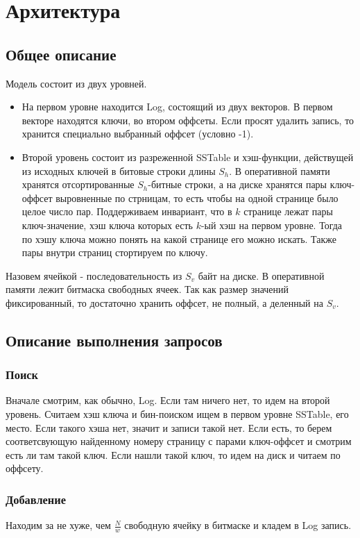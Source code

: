 \section*{Архитектура}
  \subsection*{Общее описание}
      Модель состоит из двух уровней. 
      \begin{itemize} 
      \item 
        На первом уровне находится Log, состоящий из двух векторов. В первом векторе находятся ключи, во втором оффсеты. Если просят удалить запись, то хранится специально выбранный оффсет (условно -1).
      \item
        Второй уровень состоит из разреженной SSTable и хэш-функции, действущей из исходных ключей в битовые строки длины $S_h$.
        В оперативной памяти хранятся отсортированные $S_h$-битные строки, а на диске хранятся пары ключ-оффсет выровненные по стрницам, 
        то есть чтобы на одной странице было целое число пар. Поддерживаем инвариант, что в $k$ странице лежат пары ключ-значение, хэш ключа которых есть $k$-ый хэш на первом уровне. 
        Тогда по хэшу ключа можно понять на какой странице его можно искать. Также пары внутри страниц стортируем по ключу.
      \end{itemize}

      Назовем ячейкой - последовательность из $S_v$ байт на диске. В оперативной памяти лежит битмаска свободных ячеек. 
      Так как размер значений фиксированный, то достаточно хранить оффсет, не полный, а деленный на $S_v$.

    \subsection*{Описание выполнения запросов}
      \subsubsection*{Поиск}
        Вначале смотрим, как обычно, Log. Если там ничего нет, то идем на второй уровень. 
        Считаем хэш ключа и бин-поиском ищем в первом уровне SSTable, его место. Если такого хэша нет, значит и записи такой нет.
        Если есть, то берем соответсвующую найденному номеру страницу с парами ключ-оффсет и смотрим есть ли там такой ключ. 
        Если нашли такой ключ, то идем на диск и читаем по оффсету.

      \subsubsection*{Добавление}
        Находим за не хуже, чем $\frac{N}{w}$ свободную ячейку в битмаске и кладем в Log запись.

